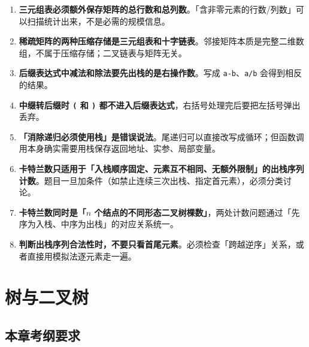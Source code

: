 \documentclass[11pt,openany,UTF8]{ctexbook}
\begin{document}
\begin{enumerate}
\item \textbf{三元组表必须额外保存矩阵的总行数和总列数}。「含非零元素的行数/列数」可以扫描统计出来，不是必需的规模信息。
\item \textbf{稀疏矩阵的两种压缩存储是三元组表和十字链表}。邻接矩阵本质是完整二维数组，不属于压缩存储；二叉链表与矩阵无关。
\item \textbf{后缀表达式中减法和除法要先出栈的是右操作数}。写成 \texttt{a-b}、\texttt{a/\allowbreak{}b} 会得到相反的结果。
\item \textbf{中缀转后缀时 \texttt{(} 和 \texttt{)\allowbreak{}} 都不进入后缀表达式}，右括号处理完后要把左括号弹出丢弃。
\item \textbf{「消除递归必须使用栈」是错误说法}。尾递归可以直接改写成循环；但函数调用本身确实需要用栈保存返回地址、实参、局部变量。
\item \textbf{卡特兰数只适用于「入栈顺序固定、元素互不相同、无额外限制」的出栈序列计数}。题目一旦加条件（如禁止连续三次出栈、指定首元素），必须分类讨论。
\item \textbf{卡特兰数同时是「$n$ 个结点的不同形态二叉树棵数」}，两处计数问题通过「先序为入栈、中序为出栈」的对应关系统一。
\item \textbf{判断出栈序列合法性时，不要只看首尾元素}。必须检查「跨越逆序」关系，或者直接用模拟法逐元素走一遍。
\end{enumerate}
\chapter{树与二叉树}
\section*{本章考纲要求}
\end{document}

